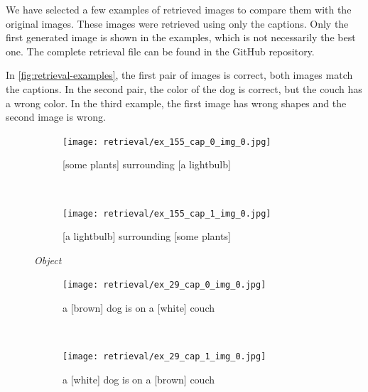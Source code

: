 We have selected a few examples of retrieved images to compare them with the original images. These images were retrieved using only the captions. Only the first generated image is shown in the examples, which is not necessarily the best one. The complete retrieval file can be found in the GitHub repository.

In \cref{fig:retrieval-examples}, the first pair of images is correct, both images match the captions. In the second pair, the color of the dog is correct, but the couch has a wrong color. In the third example, the first image has wrong shapes and the second image is wrong.

\begin{figure}[ht]
\centering
    \begin{minipage}[t]{.30\textwidth}
        \begin{subfigure}[t]{\textwidth}
        \centering
        \texttt{[image: retrieval/ex\_155\_cap\_0\_img\_0.jpg]}
        \caption{[some plants] surrounding [a lightbulb]}
        \end{subfigure}\\
        \begin{subfigure}[t]{\textwidth}
        \centering
        \texttt{[image: retrieval/ex\_155\_cap\_1\_img\_0.jpg]}
        \caption{[a lightbulb] surrounding [some plants]}
        \end{subfigure}%
        \caption*{\textit{Object}}
    \end{minipage}
    \hfill
    \begin{minipage}[t]{.30\textwidth}
        \begin{subfigure}[t]{\textwidth}
        \centering
        \texttt{[image: retrieval/ex\_29\_cap\_0\_img\_0.jpg]}
        \caption{a [brown] dog is on a [white] couch}
        \end{subfigure}\\
        \vspace{10pt}
        \begin{subfigure}[t]{\textwidth}
        \centering
        \texttt{[image: retrieval/ex\_29\_cap\_1\_img\_0.jpg]}
        \caption{a [white] dog is on a [brown] couch}
        \end{subfigure}%
        \vspace{10pt}
        \caption*{\textit{Relation}}
    \end{minipage}
    \hfill
    \begin{minipage}[t]{.30\textwidth}
        \begin{subfigure}[t]{\textwidth}

\end{subfigure}
\end{minipage}
\end{figure}
